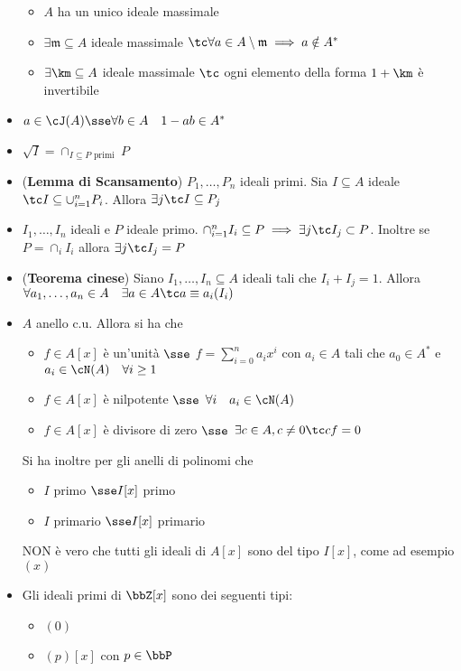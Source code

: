 \documentclass[a4paper,NoNotes,GeneralMath]{stdmdoc}
\begin{document}
\begin{itemize}
\begin{itemize}
				\item $A$ ha un unico ideale massimale
				\item $\exists \mathfrak{m} \subseteq A$ ideale massimale $\tc \forall a \in A \setminus \mathfrak{m} \implies a \notin A^*$
				\item $\exists \km \subseteq A$ ideale massimale $\tc$ ogni elemento della forma $1 + \km$ è invertibile
			\end{itemize}
		\item $a \in \cJ(A) \sse \forall b \in A \quad 1-ab \in A^*$
		\item $\sqrt{I} = \cap_{I \subseteq P \text{ primi }} P$
		\item ({\bf Lemma di Scansamento}) $P_1, \ldots, P_n$ ideali primi. Sia $I \subseteq A$ ideale $\tc I \subseteq \cup_{i=1}^n P_i$. Allora $\exists j \tc I \subseteq P_j$
		\item $I_1, \ldots, I_n$ ideali e $P$ ideale primo. $\cap_{i=1}^n I_i \subseteq P \implies \exists j \tc I_j \subset P$. Inoltre se $P = \cap_i I_i$ allora $\exists j \tc I_j = P$
		\item ({\bf Teorema cinese}) Siano $I_1, \ldots, I_n \subseteq A$ ideali tali che $I_i + I_j = 1$. Allora $\forall a_1, \ldots, a_n \in A \quad \exists a \in A \tc a \equiv a_i (I_i)$
		\item $A$ anello c.u. Allora si ha che
			\begin{itemize}
				\item $f \in A[x]$ è un'unità $\sse$ $f = \sum_{i=0}^n a_i x^i$ con $a_i \in A$ tali che $a_0 \in A^*$ e $a_i \in \cN(A) \quad \forall i \ge 1$
				\item $f \in A[x]$ è nilpotente $\sse$ $\forall i \quad a_i \in \cN(A)$
				\item $f \in A[x]$ è divisore di zero $\sse$ $\exists c \in A, c \neq 0 \tc cf = 0$
			\end{itemize}
			Si ha inoltre per gli anelli di polinomi che
			\begin{itemize}
				\item $I$ primo $\sse I[x]$ primo
				\item $I$ primario $\sse I[x]$ primario
			\end{itemize}
			NON è vero che tutti gli ideali di $A[x]$ sono del tipo $I[x]$, come ad esempio $(x)$
		\item Gli ideali primi di $\bbZ[x]$ sono dei seguenti tipi:
			\begin{itemize}
				\item $(0)$
				\item $(p)[x]$ con $p \in \bbP$

\end{itemize}
\end{itemize}
\end{document}
